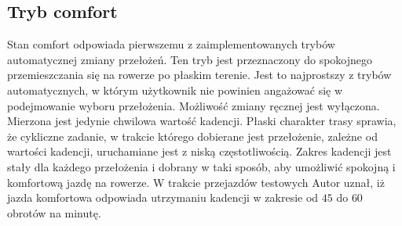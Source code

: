 \subsection{Tryb comfort}
Stan comfort odpowiada pierwszemu z zaimplementowanych trybów automatycznej zmiany przełożeń. Ten tryb jest przeznaczony do spokojnego przemieszczania się na rowerze po płaskim terenie. Jest to najprostszy z trybów automatycznych, w którym użytkownik nie powinien angażować się w podejmowanie wyboru przełożenia. Możliwość zmiany ręcznej jest wyłączona. Mierzona jest jedynie chwilowa wartość kadencji. Płaski charakter trasy sprawia, że cykliczne zadanie, w trakcie którego dobierane jest przełożenie, zależne od wartości kadencji, uruchamiane jest z niską częstotliwością. Zakres kadencji jest stały dla każdego przełożenia i dobrany w taki sposób, aby umożliwić spokojną i komfortową jazdę na rowerze. W trakcie przejazdów testowych Autor uznał, iż jazda komfortowa odpowiada utrzymaniu kadencji w zakresie od $45$ do $60$ obrotów na minutę.
